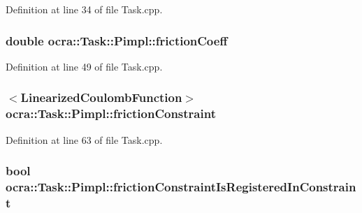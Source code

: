 Definition at line 34 of file Task.\+cpp.

\subsubsection[{\texorpdfstring{friction\+Coeff}{frictionCoeff}}]{\setlength{\rightskip}{0pt plus 5cm}double ocra\+::\+Task\+::\+Pimpl\+::friction\+Coeff}\hypertarget{structocra_1_1Task_1_1Pimpl_ad241160e0a892b49ecee3ea6a4b68bca}{}\label{structocra_1_1Task_1_1Pimpl_ad241160e0a892b49ecee3ea6a4b68bca}


Definition at line 49 of file Task.\+cpp.

\subsubsection[{\texorpdfstring{friction\+Constraint}{frictionConstraint}}]{$<${\bf Linearized\+Coulomb\+Function}$>$ ocra\+::\+Task\+::\+Pimpl\+::friction\+Constraint}\hypertarget{structocra_1_1Task_1_1Pimpl_a311170ea86291b3d4fe9b9f1cd40e0a8}{}\label{structocra_1_1Task_1_1Pimpl_a311170ea86291b3d4fe9b9f1cd40e0a8}


Definition at line 63 of file Task.\+cpp.

\subsubsection[{\texorpdfstring{friction\+Constraint\+Is\+Registered\+In\+Constraint}{frictionConstraintIsRegisteredInConstraint}}]{\setlength{\rightskip}{0pt plus 5cm}bool ocra\+::\+Task\+::\+Pimpl\+::friction\+Constraint\+Is\+Registered\+In\+Constraint}\hypertarget{structocra_1_1Task_1_1Pimpl_aa23ba3a568d9e47f1a6157715a818285}{}\label{structocra_1_1Task_1_1Pimpl_aa23ba3a568d9e47f1a6157715a818285}


